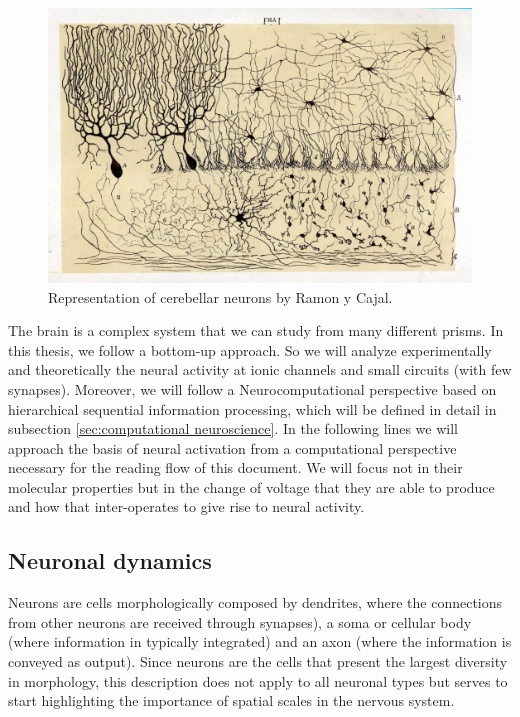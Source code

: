 \begin{figure}[htb!]
    \centering
    \includegraphics[width=\textwidth]{img/intro/CajalCerebellum.jpeg}
    \caption{Representation of cerebellar neurons by Ramon y Cajal.}
    \label{cajal-neuron}
\end{figure}


The brain is a complex system that we can study from many different prisms. In this thesis, we follow a bottom-up approach. So we will analyze experimentally and theoretically the neural activity at ionic channels and small circuits (with few synapses). Moreover, we will follow a Neurocomputational perspective based on hierarchical sequential information processing, which will be defined in detail in subsection \ref{sec:computational neuroscience}. In the following lines we will approach the basis of neural activation from a computational perspective necessary for the reading flow of this document. We will focus not in their molecular properties but in the change of voltage that they are able to produce and how that inter-operates to give rise to neural activity. 

\subsection{Neuronal dynamics}
Neurons are cells morphologically composed by dendrites, where the connections from other neurons are received through synapses), a soma or cellular body (where information in typically integrated) and an axon (where the information is conveyed as output). Since neurons are the cells that present the largest diversity in morphology, this description does not apply to all neuronal types but serves to start highlighting the importance of spatial scales in the nervous system. 

